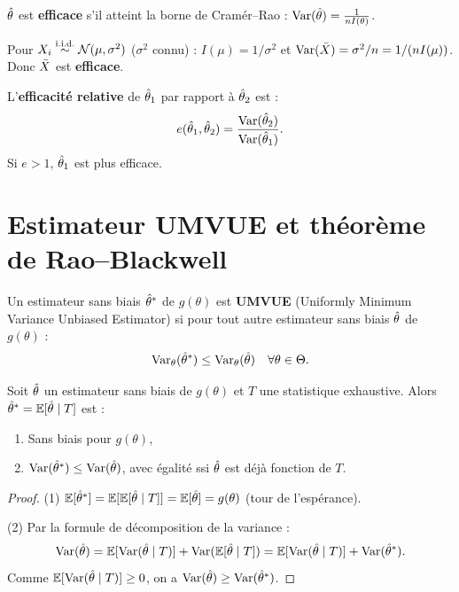 \begin{definition}
$\hat{\theta}$ est \textbf{efficace} s'il atteint la borne de Cram\'er--Rao : $\operatorname{Var}(\hat{\theta})=\frac{1}{nI(\theta)}$.
\end{definition}

\begin{exemple}
Pour $X_i\overset{\text{i.i.d.}}{\sim}\mathcal{N}(\mu,\sigma^2)$ ($\sigma^2$ connu) : $I(\mu)=1/\sigma^2$ et $\operatorname{Var}(\bar{X})=\sigma^2/n=1/(nI(\mu))$. Donc $\bar{X}$ est \textbf{efficace}.
\end{exemple}

\begin{definition}
L'\textbf{efficacit\'e relative} de $\hat{\theta}_1$ par rapport \`a $\hat{\theta}_2$ est :
\[
e(\hat{\theta}_1,\hat{\theta}_2) = \frac{\operatorname{Var}(\hat{\theta}_2)}{\operatorname{Var}(\hat{\theta}_1)}.
\]
Si $e>1$, $\hat{\theta}_1$ est plus efficace.
\end{definition}

\section{Estimateur UMVUE et th\'eor\`eme de Rao--Blackwell}

\begin{definition}[UMVUE]
Un estimateur sans biais $\hat{\theta}^*$ de $g(\theta)$ est \textbf{UMVUE} (Uniformly Minimum Variance Unbiased Estimator) si pour tout autre estimateur sans biais $\hat{\theta}$ de $g(\theta)$ :
\[
\operatorname{Var}_\theta(\hat{\theta}^*) \leq \operatorname{Var}_\theta(\hat{\theta}) \quad \forall\theta\in\Theta.
\]
\end{definition}

\begin{theoreme}
Soit $\hat{\theta}$ un estimateur sans biais de $g(\theta)$ et $T$ une statistique exhaustive. Alors $\hat{\theta}^* = \mathbb{E}[\hat{\theta}\mid T]$ est :
\begin{enumerate}
\item Sans biais pour $g(\theta)$,
\item $\operatorname{Var}(\hat{\theta}^*)\leq\operatorname{Var}(\hat{\theta})$, avec \'egalit\'e ssi $\hat{\theta}$ est d\'ej\`a fonction de $T$.
\end{enumerate}
\end{theoreme}

\begin{proof}
(1) $\mathbb{E}[\hat{\theta}^*]=\mathbb{E}[\mathbb{E}[\hat{\theta}\mid T]]=\mathbb{E}[\hat{\theta}]=g(\theta)$ (tour de l'esp\'erance).

(2) Par la formule de d\'ecomposition de la variance :
\[
\operatorname{Var}(\hat{\theta}) = \mathbb{E}[\operatorname{Var}(\hat{\theta}\mid T)] + \operatorname{Var}(\mathbb{E}[\hat{\theta}\mid T]) = \mathbb{E}[\operatorname{Var}(\hat{\theta}\mid T)] + \operatorname{Var}(\hat{\theta}^*).
\]
Comme $\mathbb{E}[\operatorname{Var}(\hat{\theta}\mid T)]\geq 0$, on a $\operatorname{Var}(\hat{\theta})\geq\operatorname{Var}(\hat{\theta}^*)$.
\end{proof}

